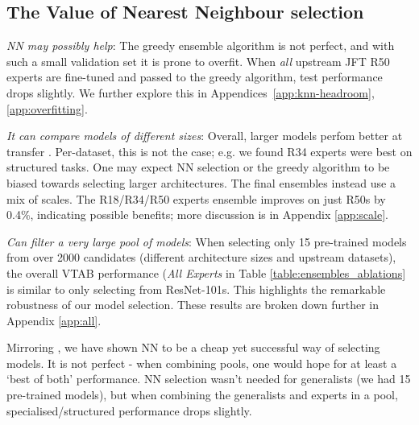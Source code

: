\documentclass{article} \usepackage{iclr2021_conference,times}
\begin{document}
\subsection{The Value of Nearest Neighbour selection}
\textit{NN may possibly help}:
The greedy ensemble algorithm is not perfect, and with such a small validation set it is prone to overfit.
When \emph{all} upstream JFT R50 experts are fine-tuned and passed to the greedy algorithm, test performance drops slightly. We further explore this in Appendices~\ref{app:knn-headroom}, \ref{app:overfitting}.

\textit{It can compare models of different sizes}: Overall, larger models perfom better at transfer \citep{alex2019big}. Per-dataset, this is not the case; e.g. we found R34 experts were best on structured tasks. One may expect NN selection or the greedy algorithm to be biased towards selecting larger architectures. The final ensembles instead use a mix of scales. The R18/R34/R50 experts ensemble improves on just R50s by 0.4\%, indicating possible benefits; more discussion is in Appendix \ref{app:scale}.

\textit{Can filter a very large pool of models}: When selecting only 15 pre-trained models from over 2000 candidates 
(different architecture sizes and upstream datasets), the overall VTAB performance 
(\emph{All Experts} in Table \ref{table:ensembles_ablations} is similar to only selecting from ResNet-101s.
This highlights the remarkable robustness of our model selection.
These results are broken down further in Appendix \ref{app:all}.

Mirroring \citet{puigcerver2020experts}, we have shown NN to be a cheap yet successful way of selecting models. It is not perfect - when combining pools, one would hope for at least a `best of both' performance. NN selection wasn't needed for generalists (we had 15 pre-trained models), but when combining the generalists and experts in a pool, specialised/structured performance drops slightly.
\end{document}
